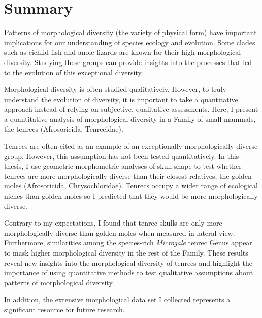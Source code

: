 \chapter*{Summary}


	Patterns of morphological diversity (the variety of physical form) have important implications for our understanding of species ecology and evolution. Some clades such as cichlid fish and anole lizards are known for their high morphological diversity. Studying these groups can provide insights into the processes that led to the evolution of this exceptional diversity. 

	Morphological diversity is often studied qualitatively. However, to truly understand the evolution of diversity, it is important to take a quantitative approach instead of relying on subjective, qualitative assessments. Here, I present a quantitative analysis of morphological diversity in a Family of small mammals, the tenrecs (Afrosoricida, Tenrecidae). 
	
	Tenrecs are often cited as an example of an exceptionally morphologically diverse group. However, this assumption has not been tested quantitatively. In this thesis, I use geometric morphometric analyses of skull shape to test whether tenrecs are more morphologically diverse than their closest relatives, the golden moles (Afrosoricida, Chrysochloridae). Tenrecs occupy a wider range of ecological niches than golden moles so I predicted that they would be more morphologically diverse. 
	
	Contrary to my expectations, I found that tenrec skulls are only more morphologically diverse than golden moles when measured in lateral view. Furthermore, similarities among the species-rich \textit{Microgale} tenrec Genus appear to mask higher morphological diversity in the rest of the Family. These results reveal new insights into the morphological diversity of tenrecs and highlight the importance of using quantitative methods to test qualitative assumptions about patterns of morphological diversity. 

	In addition, the extensive morphological data set I collected represents a significant resource for future research.
	
